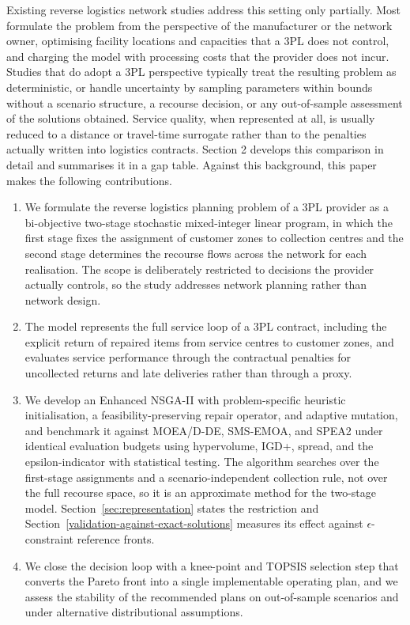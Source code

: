 \documentclass[11pt, a4paper]{article}
\begin{document}
Existing reverse logistics network studies address this setting only
partially. Most formulate the problem from the perspective of the
manufacturer or the network owner, optimising facility locations and
capacities that a 3PL does not control, and charging the model with
processing costs that the provider does not incur. Studies that do adopt a 3PL perspective typically treat the resulting problem as
deterministic, or handle uncertainty by sampling parameters within
bounds without a scenario structure, a recourse decision, or any
out-of-sample assessment of the solutions obtained. Service quality,
when represented at all, is usually reduced to a distance or
travel-time surrogate rather than to the penalties actually written into logistics contracts. Section 2 develops this comparison in detail and summarises it in a gap table. Against this background, this paper makes the following contributions.
\begin{enumerate}
\item We formulate the reverse logistics planning problem of a 3PL
provider as a bi-objective two-stage stochastic mixed-integer linear
program, in which the first stage fixes the assignment of customer
zones to collection centres and the second stage determines the recourse flows across the network for each realisation. The scope is deliberately restricted to decisions the provider actually controls, so the study addresses network planning rather than network design.
\item The model represents the full service loop of a 3PL contract, including the explicit return of repaired items from service centres to customer zones, and evaluates service performance through the contractual penalties for uncollected returns and late deliveries rather than through a proxy. 
\item We develop an Enhanced NSGA-II with
problem-specific heuristic initialisation, a feasibility-preserving
repair operator, and adaptive mutation, and benchmark it against
MOEA/D-DE, SMS-EMOA, and SPEA2 under identical evaluation budgets using hypervolume, IGD+, spread, and the epsilon-indicator with statistical testing. The algorithm searches over the first-stage assignments and a scenario-independent collection rule, not over the full recourse space, so it is an approximate method for the two-stage model. Section~\ref{sec:representation} states the restriction and Section~\ref{validation-against-exact-solutions} measures its effect against $\epsilon$-constraint reference fronts.
\item We close the decision loop with a knee-point and TOPSIS selection step that converts the Pareto front into a single implementable operating plan, and we assess the stability of the recommended plans on out-of-sample scenarios and under alternative distributional assumptions.
\end{enumerate} 
\end{document}
